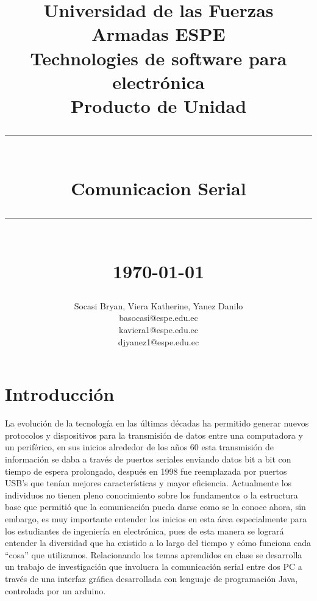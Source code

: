 \documentclass[12pt]{report}
\newcommand{\HRule}[1]{\rule{\linewidth}{#1}}
\begin{document}
\title{ \normalsize Universidad de las Fuerzas Armadas ESPE \\
		Technologies de software para electrónica\\
		Producto de Unidad
		\\ [2.0cm]
		\HRule{0.5pt} \\
		\LARGE \textbf{Comunicacion Serial} %
		\HRule{2pt} \\ [0.5cm]
		\normalsize \today \vspace*{5\baselineskip}}

\date{}

\author{
		 Socasi Bryan, Viera Katherine, Yanez Danilo \\ 
		 basocasi@espe.edu.ec\\
		 kaviera1@espe.edu.ec\\
		 djyanez1@espe.edu.ec
		 }
\maketitle

\tableofcontents
\newpage


\section{Introducción}
La evolución de la tecnología en las últimas décadas ha permitido generar nuevos protocolos y dispositivos para la transmisión de datos entre una computadora y un periférico, en sus inicios alrededor de los años 60 esta transmisión de información se daba a través de puertos seriales enviando datos bit a bit con tiempo de espera prolongado, después en 1998 fue reemplazada por puertos USB’s que tenían mejores características y mayor eficiencia. 
Actualmente los individuos no tienen pleno conocimiento sobre los fundamentos o la estructura base que permitió que la comunicación pueda darse como se la conoce ahora, sin embargo, es muy importante entender los inicios en esta área especialmente para los estudiantes de ingeniería en electrónica, pues de esta manera se logrará entender la diversidad que ha existido a lo largo del tiempo y cómo funciona cada “cosa” que utilizamos. 
Relacionando los temas aprendidos en clase se desarrolla un trabajo de investigación que involucra la comunicación serial entre dos PC a través de una interfaz gráfica desarrollada con lenguaje de programación Java, controlada por un arduino.
\newpage
\end{document}

